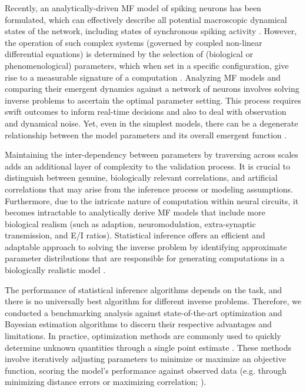 \documentclass[preprint,11pt,authoryear]{elsarticle}
\begin{document}
Recently, an analytically-driven MF model of spiking neurons has been formulated, which can effectively describe all potential macroscopic dynamical states of the network, including states of synchronous spiking activity \citep{Montbrio_Pazo_Roxin}. However, the operation of such complex systems (governed by coupled non-linear differential equations) is determined by the selection of (biological or phenomenological) parameters, which when set in a specific configuration, give rise to a measurable signature of a computation \citep{Achard2006, Sussillo2014}. Analyzing MF models and comparing their emergent dynamics against a network of neurons involves solving inverse problems to ascertain the optimal parameter setting. This process requires swift outcomes to inform real-time decisions and also to deal with observation and dynamical noise. Yet, even in the simplest models, there can be a degenerate relationship between the model parameters and its overall emergent function \citep{Edelman2001, Prinz2004, Alonso2019}. 

Maintaining the inter-dependency between parameters by traversing across scales adds an additional layer of complexity to the validation process. It is crucial to distinguish between genuine, biologically relevant correlations, and artificial correlations that may arise from the inference process or modeling assumptions. Furthermore, due to the intricate nature of computation within neural circuits, it becomes intractable to analytically derive MF models that include more biological realism (such as adaption, neuromodulation, extra-synaptic transmission, and  E/I ratios). Statistical inference offers an efficient and adaptable approach to solving the inverse problem by identifying approximate parameter distributions that are responsible for generating computations in a biologically realistic model \citep{Achard2006, Liepe2014, Lueckmann2017, Goncalves2020, Bittner2021, Mlynarski2021}. 


The performance of statistical inference algorithms depends on the task, and there is no universally best algorithm for different inverse problems. Therefore, we conducted a benchmarking analysis against state-of-the-art optimization and Bayesian estimation algorithms to discern their respective advantages and limitations.
In practice, optimization methods are commonly used to quickly determine unknown quantities through a single point estimate \citep{Mendes1998, Nocedal1999, Kelley1999, Floudas2009}. These methods involve iteratively adjusting parameters to minimize or maximize an objective function, scoring the model's performance against observed data (e.g. through minimizing distance errors or maximizing correlation; \cite{Banga2008, Tashkova2011, Svensson2012, Hashemi2018}). 
\end{document}
